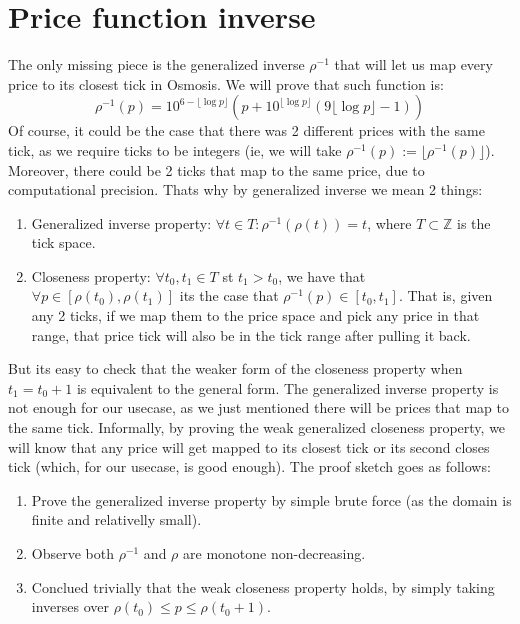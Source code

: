 \documentclass[11pt]{article}
\begin{document}
\section{Price function inverse}
The only missing piece is the generalized inverse $\rho^{-1}$ that will let
us map every price to its closest tick in Osmosis. We will prove that such
function is:
\[
\rho^{-1}(p) = 10^{6-\lfloor\log p\rfloor} \left(
	p+10^{\lfloor\log p\rfloor}\left(
		9\lfloor\log p\rfloor-1
	\right)
\right)
\]
Of course, it could be the case that there was 2 different prices with the same
tick, as we require ticks to be integers (ie, we will take $\rho^{-1}(p) :=
\lfloor \rho^{-1}(p)\rfloor$). Moreover, there could be 2 ticks that map to the
same price, due to computational precision. Thats why by generalized inverse we
mean 2 things:
\begin{enumerate}
    \item Generalized inverse property: $\forall t\in T: \rho^{-1}(\rho(t)) =
        t$, where $T\subset\mathbb Z$ is the tick space.
    \item Closeness property: $\forall t_0, t_1\in T$ st $t_1 > t_0$, we have
        that $\forall p\in [\rho(t_0), \rho(t_1)]$ its the case that
        $\rho^{-1}(p)\in[t_0, t_1]$. That is, given any 2 ticks, if we map them
        to the price space and pick any price in that range, that price tick will
        also be in the tick range after pulling it back.
\end{enumerate}
But its easy to check that the weaker form of the closeness property when $t_1
= t_0 + 1$ is equivalent to the general form. The generalized inverse property
is not enough for our usecase, as we just mentioned there will be prices that
map to the same tick. Informally, by proving the weak generalized closeness
property, we will know that any price will get mapped to its closest tick or
its second closes tick (which, for our usecase, is good enough). The proof
sketch goes as follows:
\begin{enumerate}
    \item Prove the generalized inverse property by simple brute force (as the
        domain is finite and relativelly small).
    \item Observe both $\rho^{-1}$ and $\rho$ are monotone non-decreasing.
    \item Conclued trivially that the weak closeness property holds, by simply
        taking inverses over $\rho(t_0) \leq p \leq \rho(t_0 + 1)$.
\end{enumerate}
\end{document}
